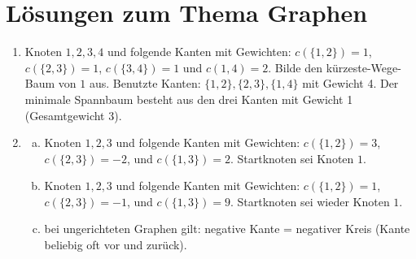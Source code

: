 \documentclass{scrartcl}
\begin{document}
\section*{Lösungen zum Thema Graphen}
\begin{enumerate}[(1)]

\item Knoten $1,2,3,4$ und folgende Kanten mit Gewichten: $c(\{1,2\})=1$, $c(\{2,3\})=1$, $c(\{3,4\})=1$ und $c({1,4})=2$.
Bilde den k\"urzeste-Wege-Baum von $1$ aus. Benutzte Kanten: $\{1,2\}, \{2,3\}, \{1,4\}$ mit Gewicht 4.
Der minimale Spannbaum besteht aus den drei Kanten mit Gewicht 1 (Gesamtgewicht 3).

\item \begin{enumerate}[(a)]
\item Knoten $1,2,3$ und folgende Kanten mit Gewichten: $c(\{1,2\})=3$, $c(\{2,3\})=-2$, und $c(\{1,3\})=2$. Startknoten sei Knoten $1$.
\item Knoten $1,2,3$ und folgende Kanten mit Gewichten: $c(\{1,2\})=1$, $c(\{2,3\})=-1$, und $c(\{1,3\})=9$. Startknoten sei wieder Knoten $1$.
\item bei ungerichteten Graphen gilt: negative Kante = negativer Kreis (Kante beliebig oft vor und zur\"uck).
\end{enumerate}


\end{enumerate}
\end{document}
